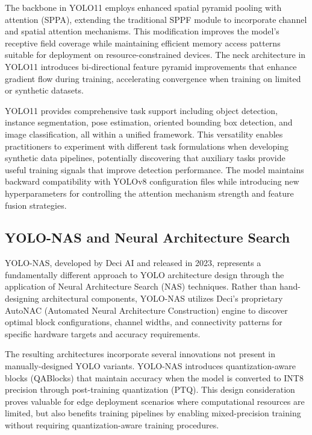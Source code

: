 The backbone in YOLO11 employs enhanced spatial pyramid pooling with attention (SPPA), extending the traditional SPPF module to incorporate channel and spatial attention mechanisms. This modification improves the model's receptive field coverage while maintaining efficient memory access patterns suitable for deployment on resource-constrained devices. The neck architecture in YOLO11 introduces bi-directional feature pyramid improvements that enhance gradient flow during training, accelerating convergence when training on limited or synthetic datasets.

YOLO11 provides comprehensive task support including object detection, instance segmentation, pose estimation, oriented bounding box detection, and image classification, all within a unified framework. This versatility enables practitioners to experiment with different task formulations when developing synthetic data pipelines, potentially discovering that auxiliary tasks provide useful training signals that improve detection performance. The model maintains backward compatibility with YOLOv8 configuration files while introducing new hyperparameters for controlling the attention mechanism strength and feature fusion strategies.

\subsection{YOLO-NAS and Neural Architecture Search}

YOLO-NAS, developed by Deci AI and released in 2023, represents a fundamentally different approach to YOLO architecture design through the application of Neural Architecture Search (NAS) techniques. Rather than hand-designing architectural components, YOLO-NAS utilizes Deci's proprietary AutoNAC (Automated Neural Architecture Construction) engine to discover optimal block configurations, channel widths, and connectivity patterns for specific hardware targets and accuracy requirements.

The resulting architectures incorporate several innovations not present in manually-designed YOLO variants. YOLO-NAS introduces quantization-aware blocks (QABlocks) that maintain accuracy when the model is converted to INT8 precision through post-training quantization (PTQ). This design consideration proves valuable for edge deployment scenarios where computational resources are limited, but also benefits training pipelines by enabling mixed-precision training without requiring quantization-aware training procedures.

